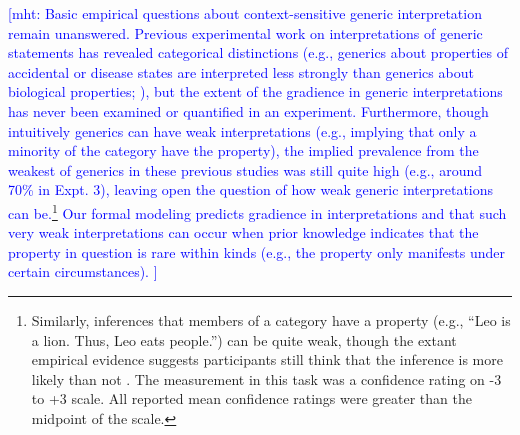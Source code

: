 \documentclass[floatsintext,doc]{apa6}
\let\rmarkdownfootnote\footnote%
\def\footnote{\protect\rmarkdownfootnote}
\newcommand{\mht}[1]{{\textcolor{Blue}{[mht: #1]}}}
\begin{document}
\mht{
Basic empirical questions about context-sensitive generic interpretation remain unanswered.
Previous experimental work on interpretations of generic statements has revealed categorical distinctions (e.g., generics about properties of accidental or disease states are interpreted less strongly than generics about biological properties; \citeNP{Cimpian2010}), but the extent of the gradience in generic interpretations has never been examined or quantified in an experiment. 
Furthermore, though intuitively generics can have weak interpretations (e.g., implying that only a minority of the category have the property), the implied prevalence from the weakest of generics in these previous studies was still quite high (e.g., around 70\% in \citeNP{Cimpian2010} Expt. 3), leaving open the question of how weak generic interpretations can be.\footnote{Similarly, inferences that members of a category have a property (e.g., \enquote{Leo is a lion. Thus, Leo eats people.}) can be quite weak, though the extant empirical evidence suggests participants still think that the inference is more likely than not \cite{Khemlani2012}. The measurement in this task was a confidence rating on -3 to +3 scale. All reported mean confidence ratings were greater than the midpoint of the scale.}
Our formal modeling predicts gradience in interpretations and that such very weak interpretations can occur when prior knowledge indicates that the property in question is rare within kinds (e.g., the property only manifests under certain circumstances).
}
%
\end{document}
